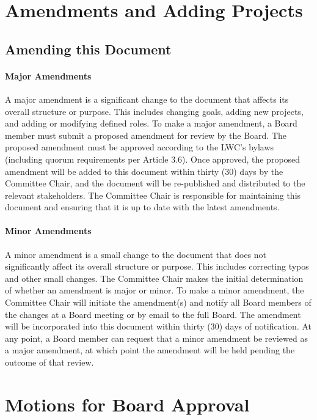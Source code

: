 \documentclass[letterpaper,11pt,leqno]{article}
\begin{document}
\section{Amendments and Adding Projects}
\subsection{Amending this Document}

\paragraph{Major Amendments} A major amendment is a significant change to the document that affects its overall structure or purpose. This includes changing goals, adding new projects, and adding or modifying defined roles.
To make a major amendment, a Board member must submit a proposed amendment for review by the Board. The proposed amendment must be approved according to the LWC's bylaws (including quorum requirements per Article 3.6).
Once approved, the proposed amendment will be added to this document within thirty (30) days by the Committee Chair, and the document will be re-published and distributed to the relevant stakeholders.
The Committee Chair is responsible for maintaining this document and ensuring that it is up to date with the latest amendments.

\paragraph{Minor Amendments} A minor amendment is a small change to the document that does not significantly affect its overall structure or purpose. This includes correcting typos and other small changes.
The Committee Chair makes the initial determination of whether an amendment is major or minor. To make a minor amendment, the Committee Chair will initiate the amendment(s) and notify all Board members of the changes at a Board meeting or by email to the full Board. The amendment will be incorporated into this document within thirty (30) days of notification. At any point, a Board member can request that a minor amendment be reviewed as a major amendment, at which point the amendment will be held pending the outcome of that review.

\appendix
\section{Motions for Board Approval}\label{a:motions}
\end{document}
